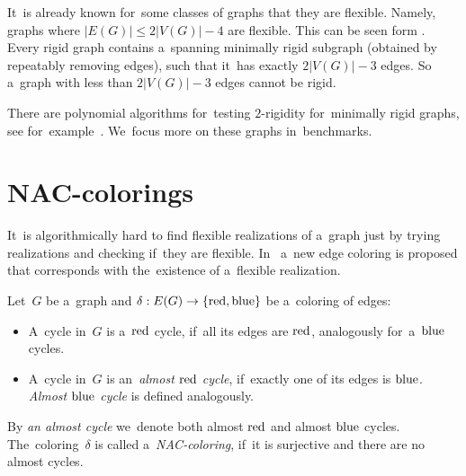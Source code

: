 It~is already known for~some classes of graphs that they are flexible.
Namely, graphs where \( |E(G)| \le 2|V(G)| - 4 \) are flexible.
This can be seen form .
Every rigid graph contains a~spanning minimally rigid subgraph
(obtained by repeatably removing edges),
such that it~has exactly \( 2|V(G)| - 3 \) edges.
So a~graph with less than \( 2|V(G)| - 3 \) edges cannot be rigid.



There are polynomial algorithms for~testing \( 2 \)-rigidity
for~minimally rigid graphs, see for~example~\cite{polynomial-min-rigid}.
We~focus more on these graphs in~benchmarks.


\section{NAC-colorings}

It~is algorithmically hard to find flexible realizations of a~graph
just by trying realizations and checking if~they are flexible.
In~\cite{legersky_original} a~new edge coloring is proposed
that corresponds with the~existence of a~flexible realization.

\begin{definition}
	Let~\( G \) be a~graph and \( \delta: E(G) \to \{ \text{red}, \text{blue} \} \)
	be a~coloring of edges:
	\begin{itemize}
		\item A~cycle in~\( G \) is a~\( \text{red} \) cycle, if~all its edges are \( \text{red} \),
		      analogously for~a~\( \text{blue} \) cycles.
		\item A~cycle in~\( G \) is an~\emph{almost \( \text{red} \) cycle},
		      if~exactly one of its edges is \( \text{blue} \).
		      \emph{Almost \( \text{blue} \) cycle} is defined analogously.
	\end{itemize}
	By \emph{an almost cycle} we~denote both almost \( \text{red} \) and almost \( \text{blue} \) cycles.
	The~coloring~\( \delta \) is called a~\emph{NAC-coloring}, if~it is surjective
	and there are no almost cycles.
\end{definition}
%

